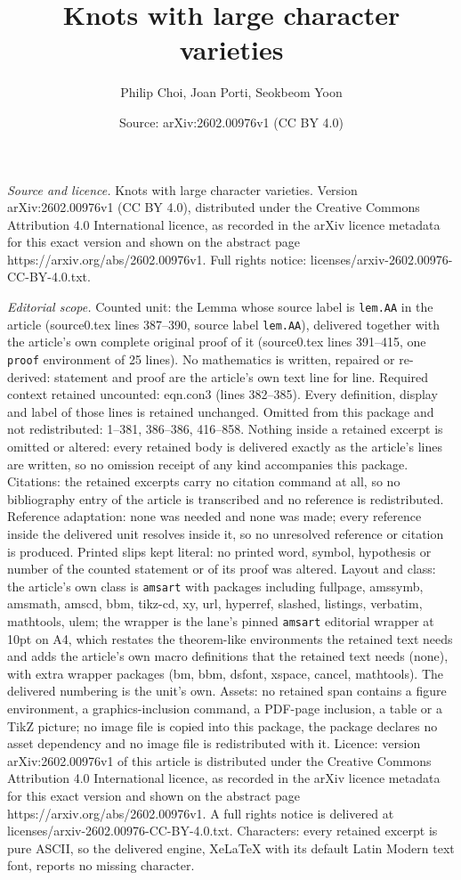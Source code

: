 \documentclass[10pt,a4paper]{amsart}
\title[Knots with large character varieties]{Knots with large character varieties}
\author{Philip Choi, Joan Porti, Seokbeom Yoon}
\date{Source: arXiv:2602.00976v1 (CC BY 4.0)}
\begin{document}
\maketitle

\noindent\emph{Source and licence.} Knots with large character varieties. Version arXiv:2602.00976v1 (CC BY 4.0), distributed under the Creative Commons Attribution 4.0 International licence, as recorded in the arXiv licence metadata for this exact version and shown on the abstract page https://arxiv.org/abs/2602.00976v1. Full rights notice: licenses/arxiv-2602.00976-CC-BY-4.0.txt.\par\smallskip

\noindent\textit{Editorial scope.} Counted unit: the Lemma whose source label is \texttt{lem.AA} in the article (source0.tex lines 387--390, source label \texttt{lem.AA}), delivered together with the article's own complete original proof of it (source0.tex lines 391--415, one \texttt{proof} environment of 25 lines). No mathematics is written, repaired or re-derived: statement and proof are the article's own text line for line. Required context retained uncounted: eqn.con3 (lines 382--385). Every definition, display and label of those lines is retained unchanged. Omitted from this package and not redistributed: 1--381, 386--386, 416--858. Nothing inside a retained excerpt is omitted or altered: every retained body is delivered exactly as the article's lines are written, so no omission receipt of any kind accompanies this package. Citations: the retained excerpts carry no citation command at all, so no bibliography entry of the article is transcribed and no reference is redistributed. Reference adaptation: none was needed and none was made; every reference inside the delivered unit resolves inside it, so no unresolved reference or citation is produced. Printed slips kept literal: no printed word, symbol, hypothesis or number of the counted statement or of its proof was altered. Layout and class: the article's own class is \texttt{amsart} with packages including fullpage, amssymb, amsmath, amscd, bbm, tikz-cd, xy, url, hyperref, slashed, listings, verbatim, mathtools, ulem; the wrapper is the lane's pinned \texttt{amsart} editorial wrapper at 10pt on A4, which restates the theorem-like environments the retained text needs and adds the article's own macro definitions that the retained text needs (none), with extra wrapper packages (bm, bbm, dsfont, xspace, cancel, mathtools). The delivered numbering is the unit's own. Assets: no retained span contains a figure environment, a graphics-inclusion command, a PDF-page inclusion, a table or a TikZ picture; no image file is copied into this package, the package declares no asset dependency and no image file is redistributed with it. Licence: version arXiv:2602.00976v1 of this article is distributed under the Creative Commons Attribution 4.0 International licence, as recorded in the arXiv licence metadata for this exact version and shown on the abstract page https://arxiv.org/abs/2602.00976v1. A full rights notice is delivered at licenses/arxiv-2602.00976-CC-BY-4.0.txt. Characters: every retained excerpt is pure ASCII, so the delivered engine, XeLaTeX with its default Latin Modern text font, reports no missing character.
\end{document}
